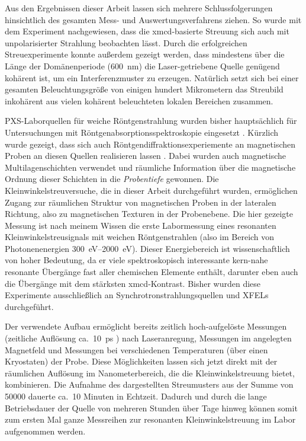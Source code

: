 \noindent
Aus den Ergebnissen dieser Arbeit lassen sich mehrere Schlussfolgerungen hinsichtlich des gesamten Mess- und Auswertungsverfahrens ziehen. So wurde mit dem Experiment nachgewiesen, dass die \gls{xmcd}-basierte Streuung sich auch mit unpolarisierter Strahlung beobachten lässt. Durch die erfolgreichen Streuexperimente konnte außerdem gezeigt werden, dass mindestens über die Länge der Domänenperiode (\SI{600}{\nano\meter}) die Laser-getriebene Quelle genügend kohärent ist, um ein Interferenzmuster zu erzeugen. Natürlich setzt sich bei einer gesamten Beleuchtungsgröße von einigen hundert Mikrometern das Streubild inkohärent aus vielen kohärent beleuchteten lokalen Bereichen zusammen.

\noindent
PXS-Laborquellen für weiche Röntgenstrahlung wurden bisher hauptsächlich für Untersuchungen mit Röntgenabsorptionsspektroskopie eingesetzt \cite{witte_electronic_2018, jonas_transient_2020, stiel_towards_2021}. Kürzlich wurde gezeigt, dass sich auch Röntgendiffraktionsexperiemente an magnetischen Proben an diesen Quellen realisieren lassen \cite{schick_laser-driven_2021}. Dabei wurden auch magnetische Multilagenschichten verwendet und räumliche Information über die magnetische Ordnung dieser Schichten in die \emph{Probentiefe} gewonnen. Die Kleinwinkelstreuversuche, die in dieser Arbeit durchgeführt wurden, ermöglichen Zugang zur räumlichen Struktur von magnetischen Proben in der lateralen Richtung, also zu magnetischen Texturen in der Probenebene. Die hier gezeigte Messung ist nach meinem Wissen die erste Labormessung eines resonanten Kleinwinkelstreusignals mit weichen Röntgenstrahlen (also im Bereich von Photonenenergien \SIrange{300}{2000}{eV}). Dieser Energiebereich ist wissenschaftlich von hoher Bedeutung, da er viele spektroskopisch interessante kern-nahe resonante Übergänge fast aller chemischen Elemente enthält, darunter eben auch die Übergänge mit dem stärksten \gls{xmcd}-Kontrast. Bisher wurden diese Experimente ausschließlich an Synchrotronstrahlungsquellen und XFELs durchgeführt.

\noindent
Der verwendete Aufbau ermöglicht bereits zeitlich hoch-aufgelöste Messungen (zeitliche Auflösung ca.\ \SI{10}{ps} \cite{schick_laser-driven_2021}) nach Laseranregung, Messungen im angelegten Magnetfeld und Messungen bei verschiedenen Temperaturen (über einen Kryostaten) der Probe. Diese Möglichkeiten lassen sich jetzt direkt mit der räumlichen Auflösung im Nanometerbereich, die die Kleinwinkelstreuung bietet, kombinieren. Die Aufnahme des dargestellten Streumusters aus der Summe von \SI{50000}{\captures} dauerte ca.\ 10 Minuten in Echtzeit. Dadurch und durch die lange Betriebsdauer der Quelle von mehreren Stunden über Tage hinweg können somit zum ersten Mal ganze Messreihen zur resonanten Kleinwinkelstreuung im Labor aufgenommen werden. 

